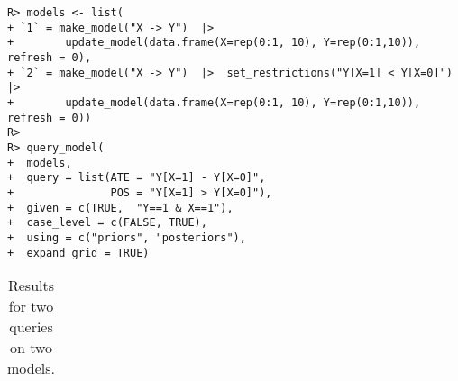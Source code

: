 \documentclass[
  11pt,
  article]{jss}
\begin{document}
\begin{verbatim}
R> models <- list(
+ `1` = make_model("X -> Y")  |> 
+        update_model(data.frame(X=rep(0:1, 10), Y=rep(0:1,10)), refresh = 0),
+ `2` = make_model("X -> Y")  |>  set_restrictions("Y[X=1] < Y[X=0]") |>
+        update_model(data.frame(X=rep(0:1, 10), Y=rep(0:1,10)), refresh = 0))
R> 
R> query_model(
+  models,
+  query = list(ATE = "Y[X=1] - Y[X=0]", 
+               POS = "Y[X=1] > Y[X=0]"),
+  given = c(TRUE,  "Y==1 & X==1"),
+  case_level = c(FALSE, TRUE),
+  using = c("priors", "posteriors"),
+  expand_grid = TRUE)
\end{verbatim}

\hypertarget{tbl-batch-query}{}
\begin{longtable}{ccccccc}
\caption{\label{tbl-batch-query}Results for two queries on two models. }\tabularnewline


\end{longtable}
\end{document}
